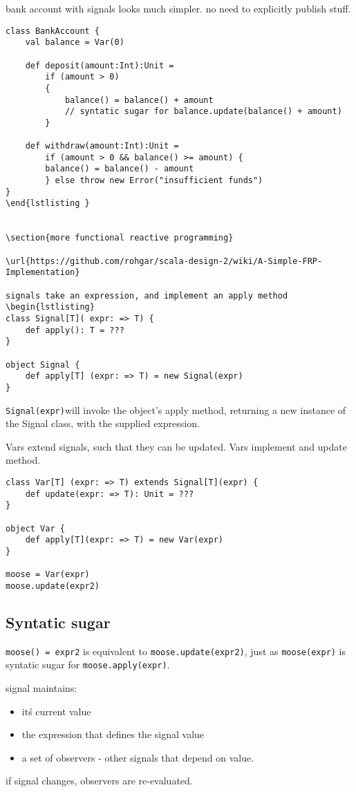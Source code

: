 bank account with signals looks much simpler. no need to explicitly publish stuff.
\begin{lstlisting}
class BankAccount {
	val balance = Var(0)
	
	def deposit(amount:Int):Unit = 
		if (amount > 0) 
		{
			balance() = balance() + amount
			// syntatic sugar for balance.update(balance() + amount)
		}

	def withdraw(amount:Int):Unit = 
		if (amount > 0 && balance() >= amount) {
		balance() = balance() - amount
		} else throw new Error("insufficient funds")
}
\end{lstlisting }


\section{more functional reactive programming}

\url{https://github.com/rohgar/scala-design-2/wiki/A-Simple-FRP-Implementation}

signals take an expression, and implement an apply method
\begin{lstlisting}
class Signal[T]( expr: => T) {
    def apply(): T = ??? 
}

object Signal {
    def apply[T] (expr: => T) = new Signal(expr)
}
\end{lstlisting}
\lstinline|Signal(expr)|will invoke the object's apply method, returning a new instance of the Signal class, with the supplied expression.

Vars extend signals, such that they can be updated. Vars implement and update method.

\begin{lstlisting}
class Var[T] (expr: => T) extends Signal[T](expr) {
    def update(expr: => T): Unit = ???
}

object Var { 
    def apply[T](expr: => T) = new Var(expr)
}

moose = Var(expr)
moose.update(expr2)
\end{lstlisting}

\subsection{Syntatic sugar}
\lstinline|moose() = expr2| is equivalent to \lstinline|moose.update(expr2)|, just as \lstinline|moose(expr)| is syntatic sugar for \lstinline|moose.apply(expr)|.


signal maintains:
\begin{itemize}
\item it\'s current value
\item the expression that defines the signal value
\item a set of observers - other signals that depend on value.
\end{itemize}
if signal changes, observers are re-evaluated.



